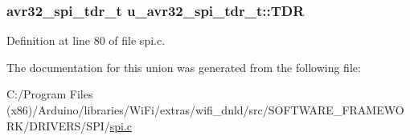 \subsubsection[{T\+D\+R}]{\setlength{\rightskip}{0pt plus 5cm}avr32\+\_\+spi\+\_\+tdr\+\_\+t u\+\_\+avr32\+\_\+spi\+\_\+tdr\+\_\+t\+::\+T\+D\+R}\label{unionu__avr32__spi__tdr__t_a425da47da39981295bab04c5b8b0d344}


Definition at line 80 of file spi.\+c.



The documentation for this union was generated from the following file\+:\begin{DoxyCompactItemize}
\item 
C\+:/\+Program Files (x86)/\+Arduino/libraries/\+Wi\+Fi/extras/wifi\+\_\+dnld/src/\+S\+O\+F\+T\+W\+A\+R\+E\+\_\+\+F\+R\+A\+M\+E\+W\+O\+R\+K/\+D\+R\+I\+V\+E\+R\+S/\+S\+P\+I/\hyperlink{spi_8c}{spi.\+c}\end{DoxyCompactItemize}
